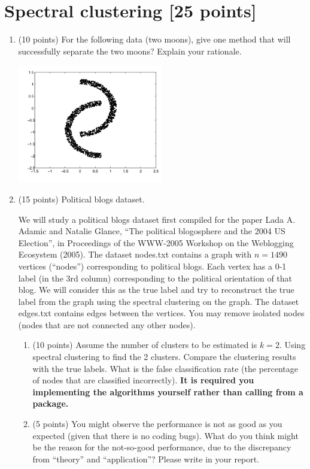 \documentclass[twoside,10pt]{article}
\begin{document}
\section{Spectral clustering [25 points]}


\begin{enumerate}

\item (10 points) For the following data (two moons), give one method that will successfully separate the two moons? Explain your rationale. 

\begin{center}
\includegraphics[width = 0.5\textwidth]{moon}
\end{center}



\item (15 points) Political blogs dataset. 

We will study a political blogs dataset first compiled for the paper Lada A. Adamic and Natalie Glance, ``The political blogosphere and the 2004 US Election'', in Proceedings of the WWW-2005 Workshop on the Weblogging Ecosystem (2005). The dataset \textsf{nodes.txt} contains a graph with $n = 1490$ vertices (``nodes'') corresponding to political blogs. Each vertex has a 0-1 label (in the 3rd column) corresponding to the political orientation of that blog. We will consider this as the true label and try to reconstruct the true label from the graph using the spectral clustering on the graph. The dataset \textsf{edges.txt} contains edges between the vertices. You may remove isolated nodes (nodes that are not connected any other nodes). 


\begin{enumerate}
\item (10 points)  Assume the number of clusters to be estimated is $k = 2$. Using spectral clustering to find the 2 clusters. Compare the clustering results with the true labels. What is the false classification rate (the percentage of nodes that are classified incorrectly). {\bf It is required you implementing the algorithms yourself rather than calling from a package.}

\item (5 points) You might observe the performance is not as good as you expected (given that there is no coding bugs). What do you think might be the reason for the not-so-good performance, due to the discrepancy from ``theory'' and ``application''? Please write in your report. 
\end{enumerate}

\end{enumerate}
\end{document}
